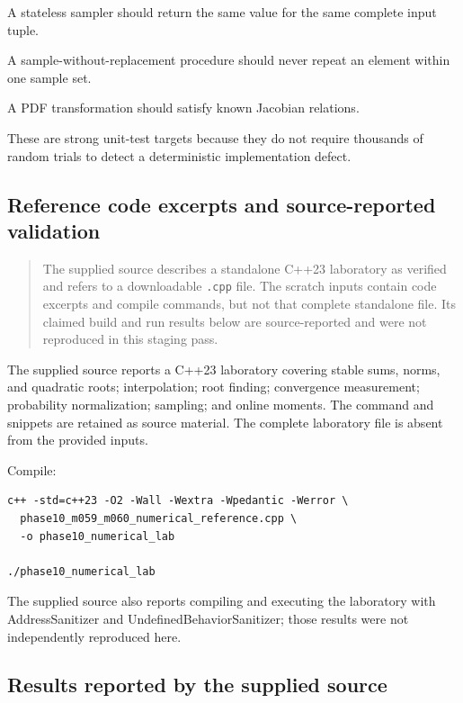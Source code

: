 A stateless sampler should return the same value for the same complete input tuple.

A sample-without-replacement procedure should never repeat an element within one sample set.

A PDF transformation should satisfy known Jacobian relations.

These are strong unit-test targets because they do not require thousands of random trials to detect a deterministic implementation defect.

\subsection{Reference code excerpts and source-reported validation}\label{02-foundations-ii-ch031-reference-code-excerpts-and-source-reported-validation}

\begin{quote}
The supplied source describes a standalone C++23 laboratory as verified and refers to a downloadable \texttt{.cpp} file. The scratch inputs contain code excerpts and compile commands, but not that complete standalone file. Its claimed build and run results below are source-reported and were not reproduced in this staging pass.
\end{quote}

The supplied source reports a C++23 laboratory covering stable sums, norms, and quadratic roots; interpolation; root finding; convergence measurement; probability normalization; sampling; and online moments. The command and snippets are retained as source material. The complete laboratory file is absent from the provided inputs.

Compile:

\begin{verbatim}
c++ -std=c++23 -O2 -Wall -Wextra -Wpedantic -Werror \
  phase10_m059_m060_numerical_reference.cpp \
  -o phase10_numerical_lab

./phase10_numerical_lab
\end{verbatim}

The supplied source also reports compiling and executing the laboratory with AddressSanitizer and UndefinedBehaviorSanitizer; those results were not independently reproduced here.

\subsection{Results reported by the supplied source}\label{02-foundations-ii-ch031-results-reported-by-the-supplied-source}

